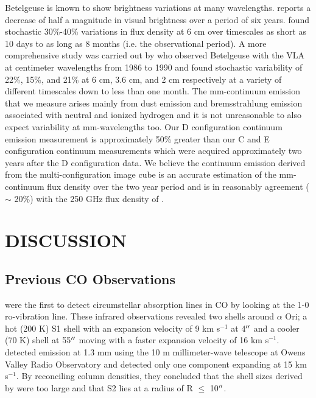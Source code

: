 \documentclass[preprint2]{aastex}
\begin{document}
Betelgeuse is known to show brightness variations at many wavelengths. \cite{1984PASP...96..366G} reports a decrease of half a magnitude in visual brightness over a period of six years. \cite{1987LNP...291..337B} found stochastic 30\%-40\% variations in flux density at 6 cm over timescales as short as 10 days to as long as 8 months (i.e. the observational period). A more comprehensive study was carried out by \cite{1992ASPC...26..455D} who observed Betelgeuse with the VLA at centimeter wavelengths from 1986 to 1990 and found stochastic variability of 22\%, 15\%, and 21\% at 6 cm, 3.6 cm, and 2 cm respectively at a variety of different timescales down to less than one month. The mm-continuum emission that we measure arises mainly from dust emission and bremsstrahlung emission associated with neutral and ionized hydrogen and it is not unreasonable to also expect variability at mm-wavelengths too. Our D configuration continuum emission measurement is approximately 50\% greater than our C and E configuration continuum measurements which were acquired approximately two years after the D configuration data. We believe the continuum emission derived from the multi-configuration image cube is an accurate estimation of the mm-continuum flux density over the two year period and is in reasonably agreement ($\sim$ 20\%) with the 250 GHz flux density of \cite{1994A&A...281..161A}.

\section{DISCUSSION}
\subsection{Previous CO Observations}
\cite{1979ApJ...233L.135B} were the first to detect circumstellar absorption lines in CO by looking at the 1-0 ro-vibration line. These infrared observations revealed two shells around $\alpha$ Ori; a hot (200 K) S1 shell with an expansion velocity of 9 km s${}^{-1}$ at 4$\mbox{$^{\prime\prime}$}$ and a cooler (70 K) shell at 55$\mbox{$^{\prime\prime}$}$ moving with a faster expansion velocity of 16 km s${}^{-1}$. \cite{1980ApJ...242L..25K} detected emission at 1.3 mm using the 10 m millimeter-wave telescope at Owens Valley Radio Observatory and detected only one component expanding at 15 km s${}^{-1}$. By reconciling column densities, they concluded that the shell sizes derived by \cite{1979ApJ...233L.135B} were too large and that S2 lies at a radius of R $\leq$ 10$\mbox{$^{\prime\prime}$}$.
\end{document}
